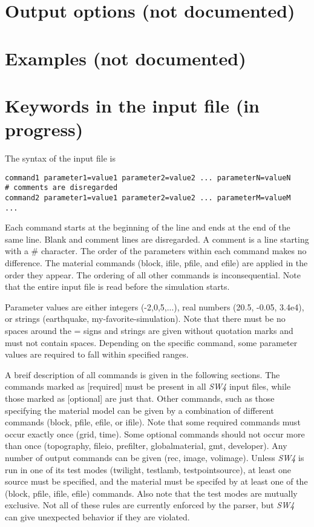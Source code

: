 \documentclass[11pt]{report}
\begin{document}
\chapter{Output options (not documented)}

\chapter{Examples (not documented)} \label{sec:examples}

\chapter{Keywords in the input file (in progress)}\label{chap:keywords}
The syntax of the input file is
\begin{verbatim}
command1 parameter1=value1 parameter2=value2 ... parameterN=valueN
# comments are disregarded
command2 parameter1=value1 parameter2=value2 ... parameterM=valueM
...
\end{verbatim}
Each command starts at the beginning of the line and ends at the end of the same line. Blank and
comment lines are disregarded. A comment is a line starting with a \# character. The order of the
parameters within each command makes no difference. The material commands (block, ifile, pfile, and efile)
are applied in the order they appear. The ordering of all other commands is inconsequential. Note
that the entire input file is read before the simulation starts.

Parameter values are either integers (-2,0,5,...), real numbers (20.5, -0.05, 3.4e4), or strings
(earthquake, my-favorite-simulation). Note that there must be no spaces around the = signs and
strings are given without quotation marks and must not contain spaces. Depending on the specific
command, some parameter values are required to fall within specified ranges.

A breif description of all commands is given in the following sections. The commands marked as
[required] must be present in all \emph{SW4} input files, while those marked as [optional] are just
that. Other commands, such as those specifying the material model can be given by a combination of
different commands (block, pfile, efile, or ifile). Note that some required commands must occur
exactly once (grid, time). Some optional commands should not occur more than once (topography,
fileio, prefilter, globalmaterial, gmt, developer). Any number of output commands can
be given (rec, image, volimage). Unless \emph{SW4} is run in one of its test modes (twilight,
testlamb, testpointsource), at least one source must be specified, and the material must be specifed
by at least one of the (block, pfile, ifile, efile) commands. Also note that the test modes are
mutually exclusive. Not all of these rules are currently enforced by the parser, but \emph{SW4} can
give unexpected behavior if they are violated.
\end{document}
